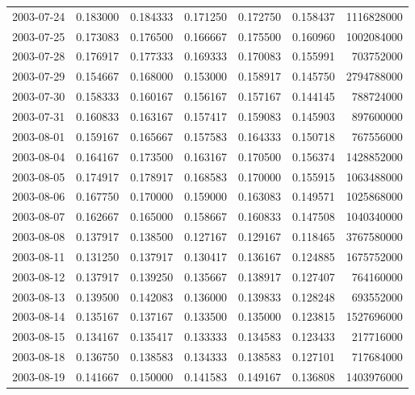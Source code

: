 \begin{tabular}{lrrrrrr}
2003-07-24 &    0.183000 &    0.184333 &    0.171250 &    0.172750 &    0.158437 &  1116828000 \\
2003-07-25 &    0.173083 &    0.176500 &    0.166667 &    0.175500 &    0.160960 &  1002084000 \\
2003-07-28 &    0.176917 &    0.177333 &    0.169333 &    0.170083 &    0.155991 &   703752000 \\
2003-07-29 &    0.154667 &    0.168000 &    0.153000 &    0.158917 &    0.145750 &  2794788000 \\
2003-07-30 &    0.158333 &    0.160167 &    0.156167 &    0.157167 &    0.144145 &   788724000 \\
2003-07-31 &    0.160833 &    0.163167 &    0.157417 &    0.159083 &    0.145903 &   897600000 \\
2003-08-01 &    0.159167 &    0.165667 &    0.157583 &    0.164333 &    0.150718 &   767556000 \\
2003-08-04 &    0.164167 &    0.173500 &    0.163167 &    0.170500 &    0.156374 &  1428852000 \\
2003-08-05 &    0.174917 &    0.178917 &    0.168583 &    0.170000 &    0.155915 &  1063488000 \\
2003-08-06 &    0.167750 &    0.170000 &    0.159000 &    0.163083 &    0.149571 &  1025868000 \\
2003-08-07 &    0.162667 &    0.165000 &    0.158667 &    0.160833 &    0.147508 &  1040340000 \\
2003-08-08 &    0.137917 &    0.138500 &    0.127167 &    0.129167 &    0.118465 &  3767580000 \\
2003-08-11 &    0.131250 &    0.137917 &    0.130417 &    0.136167 &    0.124885 &  1675752000 \\
2003-08-12 &    0.137917 &    0.139250 &    0.135667 &    0.138917 &    0.127407 &   764160000 \\
2003-08-13 &    0.139500 &    0.142083 &    0.136000 &    0.139833 &    0.128248 &   693552000 \\
2003-08-14 &    0.135167 &    0.137167 &    0.133500 &    0.135000 &    0.123815 &  1527696000 \\
2003-08-15 &    0.134167 &    0.135417 &    0.133333 &    0.134583 &    0.123433 &   217716000 \\
2003-08-18 &    0.136750 &    0.138583 &    0.134333 &    0.138583 &    0.127101 &   717684000 \\
2003-08-19 &    0.141667 &    0.150000 &    0.141583 &    0.149167 &    0.136808 &  1403976000 \\

\end{tabular}
